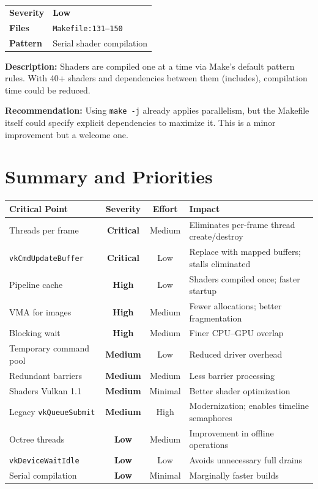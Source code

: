 \documentclass[a4paper,10pt]{article}
\newcommand{\severity}[1]{%
  \ifstrequal{#1}{Critical}{\textcolor{high}{\textbf{#1}}}{%
  \ifstrequal{#1}{High}{\textcolor{high}{\textbf{#1}}}{%
  \ifstrequal{#1}{Medium}{\textcolor{medium}{\textbf{#1}}}{%
  \ifstrequal{#1}{Low}{\textcolor{low}{\textbf{#1}}}{#1}}}}}
\begin{document}
\begin{tabular}{ll}
    \textbf{Severity} & \severity{Low} \\
    \textbf{Files}     & \texttt{Makefile:131--150} \\
    \textbf{Pattern}   & Serial shader compilation
\end{tabular}

\vspace{0.5em}
\noindent
\textbf{Description:} Shaders are compiled one at a time via Make's default
pattern rules. With 40+ shaders and dependencies between them (includes),
compilation time could be reduced.

\noindent\textbf{Recommendation:} Using \texttt{make -j} already applies
parallelism, but the Makefile itself could specify explicit dependencies to
maximize it. This is a minor improvement but a welcome one.

\section{Summary and Priorities}

\begin{longtable}{p{}ccp{}}
    \toprule
    \textbf{Critical Point} & \textbf{Severity} & \textbf{Effort} & \textbf{Impact} \\
    \midrule
    \endhead
    \bottomrule
    \endfoot
    Threads per frame
        & \severity{Critical}
        & Medium
        & Eliminates per-frame thread create/destroy \\
    \texttt{vkCmdUpdateBuffer}
        & \severity{Critical}
        & Low
        & Replace with mapped buffers; stalls eliminated \\
    Pipeline cache
        & \severity{High}
        & Low
        & Shaders compiled once; faster startup \\
    VMA for images
        & \severity{High}
        & Medium
        & Fewer allocations; better fragmentation \\
    Blocking wait
        & \severity{High}
        & Medium
        & Finer CPU--GPU overlap \\
    Temporary command pool
        & \severity{Medium}
        & Low
        & Reduced driver overhead \\
    Redundant barriers
        & \severity{Medium}
        & Medium
        & Less barrier processing \\
    Shaders Vulkan 1.1
        & \severity{Medium}
        & Minimal
        & Better shader optimization \\
    Legacy \texttt{vkQueueSubmit}
        & \severity{Medium}
        & High
        & Modernization; enables timeline semaphores \\
    Octree threads
        & \severity{Low}
        & Medium
        & Improvement in offline operations \\
    \texttt{vkDeviceWaitIdle}
        & \severity{Low}
        & Low
        & Avoids unnecessary full drains \\
    Serial compilation
        & \severity{Low}
        & Minimal
        & Marginally faster builds \\
\end{longtable}
\end{document}
